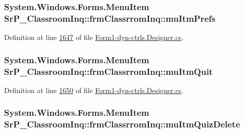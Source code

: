 \hypertarget{class_sr_p___classroom_inq_1_1frm_classrrom_inq_a13631d0933d2eb8825ef015322073644}{
\subsubsection[{mu\-Itm\-Prefs}]{\setlength{\rightskip}{0pt plus 5cm}\-System.\-Windows.\-Forms.\-Menu\-Item {\bf \-Sr\-P\-\_\-\-Classroom\-Inq\-::frm\-Classrrom\-Inq\-::mu\-Itm\-Prefs}}}
\label{class_sr_p___classroom_inq_1_1frm_classrrom_inq_a13631d0933d2eb8825ef015322073644}


\-Definition at line \hyperlink{_form1-dyn-ctrls_8_designer_8cs_source_l01647}{1647} of file \hyperlink{_form1-dyn-ctrls_8_designer_8cs_source}{\-Form1-\/dyn-\/ctrls.\-Designer.\-cs}.

\hypertarget{class_sr_p___classroom_inq_1_1frm_classrrom_inq_a139fd89a3fbbc5272712ac921557dd03}{
\subsubsection[{mu\-Itm\-Quit}]{\setlength{\rightskip}{0pt plus 5cm}\-System.\-Windows.\-Forms.\-Menu\-Item {\bf \-Sr\-P\-\_\-\-Classroom\-Inq\-::frm\-Classrrom\-Inq\-::mu\-Itm\-Quit}}}
\label{class_sr_p___classroom_inq_1_1frm_classrrom_inq_a139fd89a3fbbc5272712ac921557dd03}


\-Definition at line \hyperlink{_form1-dyn-ctrls_8_designer_8cs_source_l01650}{1650} of file \hyperlink{_form1-dyn-ctrls_8_designer_8cs_source}{\-Form1-\/dyn-\/ctrls.\-Designer.\-cs}.

\hypertarget{class_sr_p___classroom_inq_1_1frm_classrrom_inq_a2d03550cfd9c6e91732a9a669089cb48}{
\subsubsection[{mu\-Itm\-Quiz\-Delete}]{\setlength{\rightskip}{0pt plus 5cm}\-System.\-Windows.\-Forms.\-Menu\-Item {\bf \-Sr\-P\-\_\-\-Classroom\-Inq\-::frm\-Classrrom\-Inq\-::mu\-Itm\-Quiz\-Delete}}}
\label{class_sr_p___classroom_inq_1_1frm_classrrom_inq_a2d03550cfd9c6e91732a9a669089cb48}


